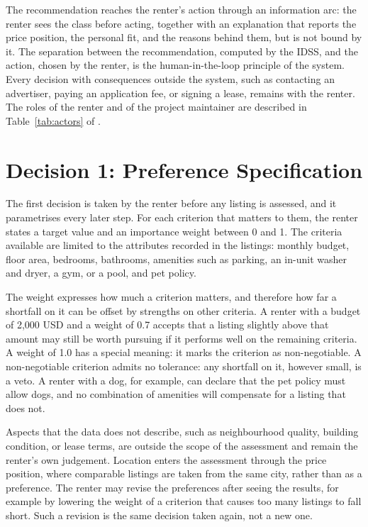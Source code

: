 \documentclass[12pt,a4paper]{report}
\begin{document}
The recommendation reaches the renter's action through an information
arc: the renter sees the class before acting, together with an
explanation that reports the price position, the personal fit, and the
reasons behind them, but is not bound by it. The separation between the recommendation, computed by the
IDSS, and the action, chosen by the renter, is the human-in-the-loop
principle of the system. Every decision
with consequences outside the system, such as contacting an advertiser,
paying an application fee, or signing a lease, remains with the renter.
The roles of the renter and of the project maintainer are described in
Table~\ref{tab:actors} of .

\section{Decision 1: Preference Specification}

The first decision is taken by the renter before any listing is assessed,
and it parametrises every later step. For each criterion that matters to
them, the renter states a target value and an importance weight between 0
and 1. The criteria available are limited to the attributes recorded in the
listings: monthly budget, floor area, bedrooms, bathrooms, amenities such as
parking, an in-unit washer and dryer, a gym, or a pool, and pet policy.

The weight expresses how much a criterion matters, and therefore how far a
shortfall on it can be offset by strengths on other criteria. A renter with
a budget of 2,000 USD and a weight of 0.7 accepts that a listing slightly
above that amount may still be worth pursuing if it performs well on the
remaining criteria. A weight of 1.0 has a special meaning: it marks the
criterion as non-negotiable. A non-negotiable criterion admits no tolerance:
any shortfall on it, however small, is a veto. A renter with a dog, for example, can declare
that the pet policy must allow dogs, and no combination of amenities will
compensate for a listing that does not.

Aspects that the data does not describe, such as neighbourhood quality,
building condition, or lease terms, are outside the scope of the
assessment and remain the renter's own judgement. Location enters the
assessment through the price position, where comparable listings are taken
from the same city, rather than as a preference. The renter may revise the
preferences after seeing the results, for example by lowering the weight of
a criterion that causes too many listings to fall short. Such a revision is
the same decision taken again, not a new one.
\end{document}

